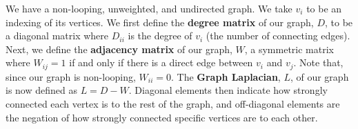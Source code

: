 We have a non-looping, unweighted, and undirected graph. We take $v_i$ to be an indexing of its vertices.
We first define the \textbf{degree matrix} of our graph, $D$, to be a diagonal matrix where $D_{ii}$ is the degree of $v_i$ (the number of connecting edges).
Next, we define the \textbf{adjacency matrix} of our graph, $W$, a symmetric matrix where $W_{ij}=1$ if and only if there is a direct edge between $v_i$ and $v_j$. Note that, since our graph is non-looping, $W_{ii}=0$.
The \textbf{Graph Laplacian}, $L$, of our graph is now defined as $L=D-W$. Diagonal elements then indicate how strongly connected each vertex is to the rest of the graph, and off-diagonal elements are the negation of how strongly connected specific vertices are to each other.